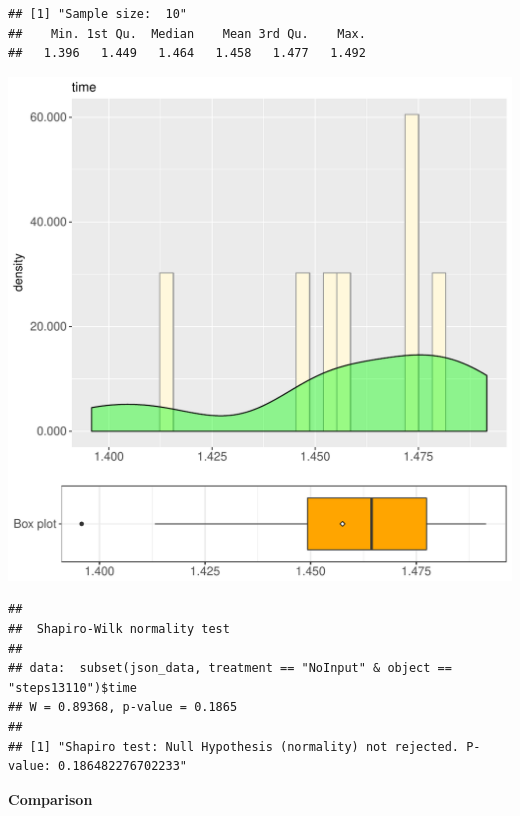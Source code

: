 \documentclass{article}\usepackage[]{graphicx}\usepackage[]{color}
\makeatletter
\def\maxwidth{ %
  \ifdim\Gin@nat@width>\linewidth
    \linewidth
  \else
    \Gin@nat@width
  \fi
}
\newenvironment{kframe}{%
 \def\at@end@of@kframe{}%
 \ifinner\ifhmode%
  \def\at@end@of@kframe{\end{minipage}}%
  \begin{minipage}{\columnwidth}%
 \fi\fi%
 \def\FrameCommand##1{\hskip\@totalleftmargin \hskip-\fboxsep
 \colorbox{shadecolor}{##1}\hskip-\fboxsep
     \hskip-\linewidth \hskip-\@totalleftmargin \hskip\columnwidth}%
 \MakeFramed {\advance\hsize-\width
   \@totalleftmargin\z@ \linewidth\hsize
   \@setminipage}}%
 {\par\unskip\endMakeFramed%
 \at@end@of@kframe}
\newenvironment{knitrout}{}{} %
\makeatother
\begin{document}
\begin{knitrout}
\color{fgcolor}\begin{kframe}
\begin{verbatim}
## [1] "Sample size:  10"
##    Min. 1st Qu.  Median    Mean 3rd Qu.    Max. 
##   1.396   1.449   1.464   1.458   1.477   1.492
\end{verbatim}
\end{kframe}
\includegraphics[width=\maxwidth]{figure/RH4_NoInput_steps13110-1} 
\begin{kframe}\begin{verbatim}
## 
## 	Shapiro-Wilk normality test
## 
## data:  subset(json_data, treatment == "NoInput" & object == "steps13110")$time
## W = 0.89368, p-value = 0.1865
## 
## [1] "Shapiro test: Null Hypothesis (normality) not rejected. P-value: 0.186482276702233"
\end{verbatim}
\end{kframe}
\end{knitrout}
  
 \textbf{Comparison}
  
\end{document}
